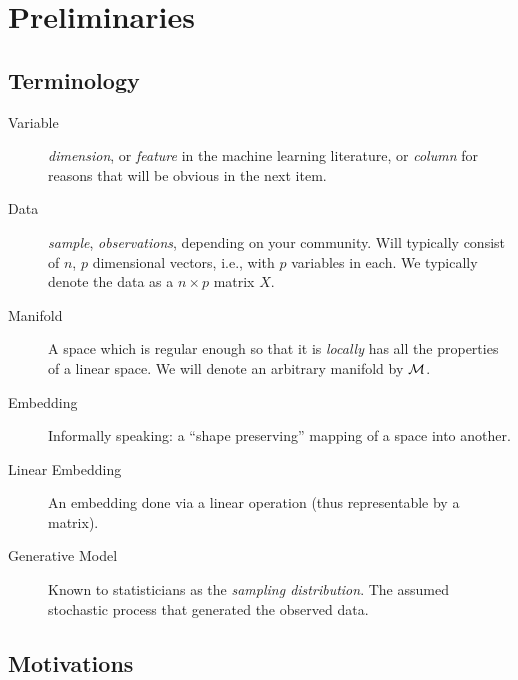 \documentclass[12pt,a4paper]{article}
\begin{document}
\section{Preliminaries}

\subsection{Terminology}

\begin{tcolorbox}
	\begin{description}
		
		\item[Variable] \Aka \emph{dimension}, or \emph{feature} in the machine learning literature, or \emph{column} for reasons that will be obvious in the next item. 
		
		\item[Data] \Aka \emph{sample}, \emph{observations}, depending on your community. 
		Will typically consist of $n$, $p$ dimensional vectors, i.e., with $p$ variables in each.
		We typically denote the data as a $n\times p$ matrix $X$. 
		
		\item[Manifold] A space which is regular enough so that it is \emph{locally} has all the properties of a linear space. 
		We will denote an arbitrary manifold by $\mathcal{M}$.
		
		
		\item[Embedding] Informally speaking: a ``shape preserving'' mapping of a space into another. 
		
		\item[Linear Embedding] An embedding done via a linear operation (thus representable by a matrix). 
		
		\item[Generative Model] Known to statisticians as the \emph{sampling distribution}. 
		The assumed stochastic process that generated the observed data. 
		
	\end{description}
\end{tcolorbox}




\subsection{Motivations}
\end{document}
